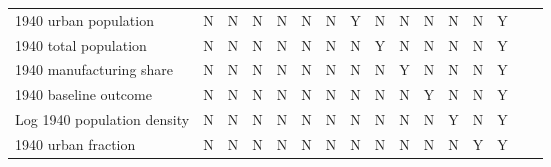 \begin{tabular}{l*{15}{c}}
1940 urban population&     N   &     N   &     N   &     N   &     N   &     N   &     Y   &     N   &     N   &     N   &     N   &     N   &     Y   \\
1940 total population&     N   &     N   &     N   &     N   &     N   &     N   &     N   &     Y   &     N   &     N   &     N   &     N   &     Y   \\
1940 manufacturing share&     N   &     N   &     N   &     N   &     N   &     N   &     N   &     N   &     Y   &     N   &     N   &     N   &     Y   \\
1940 baseline outcome&     N   &     N   &     N   &     N   &     N   &     N   &     N   &     N   &     N   &     Y   &     N   &     N   &     Y   \\
Log 1940 population density&     N   &     N   &     N   &     N   &     N   &     N   &     N   &     N   &     N   &     N   &     Y   &     N   &     Y   \\
1940 urban fraction &     N   &     N   &     N   &     N   &     N   &     N   &     N   &     N   &     N   &     N   &     N   &     Y   &     Y   \\
\bottomrule \end{tabular}
